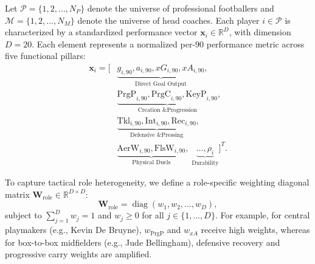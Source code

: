 \documentclass[10pt,journal,compsoc]{IEEEtran}
\begin{document}
Let $\mathcal{P} = \{1, 2, \dots, N_P\}$ denote the universe of professional footballers and $\mathcal{M} = \{1, 2, \dots, N_M\}$ denote the universe of head coaches. Each player $i \in \mathcal{P}$ is characterized by a standardized performance vector $\mathbf{x}_i \in \mathbb{R}^D$, with dimension $D = 20$. Each element represents a normalized per-90 performance metric across five functional pillars:
\begin{equation}
\begin{aligned}
\mathbf{x}_i = \Big[ & \underbrace{g_{i,90}, a_{i,90}, xG_{i,90}, xA_{i,90}}_{\text{Direct Goal Output}}, \\
& \underbrace{\mathrm{PrgP}_{i,90}, \mathrm{PrgC}_{i,90}, \mathrm{KeyP}_{i,90}}_{\text{Creation \& Progression}}, \\
& \underbrace{\mathrm{Tkl}_{i,90}, \mathrm{Int}_{i,90}, \mathrm{Rec}_{i,90}}_{\text{Defensive \& Pressing}}, \\
& \underbrace{\mathrm{AerW}_{i,90}, \mathrm{FlsW}_{i,90}}_{\text{Physical Duels}}, \; \underbrace{\dots, \rho_{i}}_{\text{Durability}} \Big]^T.
\end{aligned}
\end{equation}

To capture tactical role heterogeneity, we define a role-specific weighting diagonal matrix $\mathbf{W}_{\mathrm{role}} \in \mathbb{R}^{D \times D}$:
\begin{equation}
\mathbf{W}_{\mathrm{role}} = \operatorname{diag}(w_1, w_2, \dots, w_D),
\end{equation}
subject to $\sum_{j=1}^D w_j = 1$ and $w_j \ge 0$ for all $j \in \{1, \dots, D\}$. For example, for central playmakers (e.g., Kevin De Bruyne), $w_{\mathrm{PrgP}}$ and $w_{xA}$ receive high weights, whereas for box-to-box midfielders (e.g., Jude Bellingham), defensive recovery and progressive carry weights are amplified.
\end{document}
